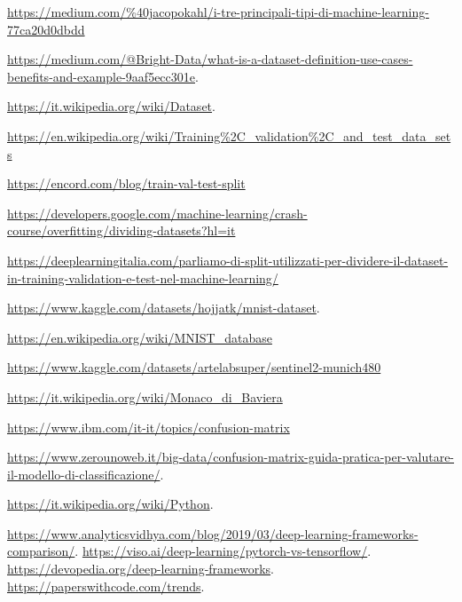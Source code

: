 \begin{thebibliography}{99}
\url{https://medium.com/%40jacopokahl/i-tre-principali-tipi-di-machine-learning-77ca20d0dbdd}

\url{https://medium.com/@Bright-Data/what-is-a-dataset-definition-use-cases-benefits-and-example-9aaf5ecc301e}.

\url{https://it.wikipedia.org/wiki/Dataset}.

\url{https://en.wikipedia.org/wiki/Training%2C_validation%2C_and_test_data_sets}

\url{https://encord.com/blog/train-val-test-split}

\url{https://developers.google.com/machine-learning/crash-course/overfitting/dividing-datasets?hl=it}

\url{https://deeplearningitalia.com/parliamo-di-split-utilizzati-per-dividere-il-dataset-in-training-validation-e-test-nel-machine-learning/}

\url{https://www.kaggle.com/datasets/hojjatk/mnist-dataset}.

\url{https://en.wikipedia.org/wiki/MNIST_database}

\url{https://www.kaggle.com/datasets/artelabsuper/sentinel2-munich480}

\url{https://it.wikipedia.org/wiki/Monaco_di_Baviera}


\url{https://www.ibm.com/it-it/topics/confusion-matrix}

\url{https://www.zerounoweb.it/big-data/confusion-matrix-guida-pratica-per-valutare-il-modello-di-classificazione/}.

\url{https://it.wikipedia.org/wiki/Python}.

\url{https://www.analyticsvidhya.com/blog/2019/03/deep-learning-frameworks-comparison/}.
\url{https://viso.ai/deep-learning/pytorch-vs-tensorflow/}.
\url{https://devopedia.org/deep-learning-frameworks}.
\url{https://paperswithcode.com/trends}.


\end{thebibliography}
